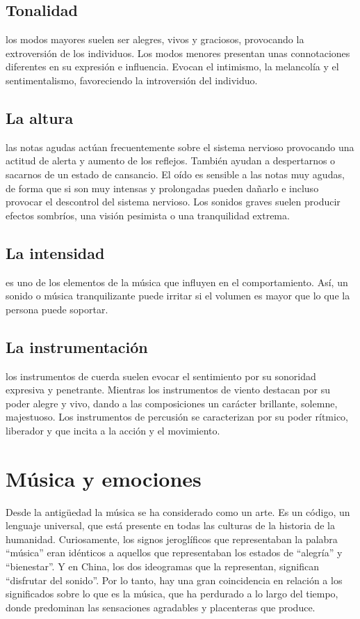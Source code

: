 \documentclass{bmcart}
\begin{document}
\subsection*{Tonalidad}
los modos mayores suelen ser alegres, vivos y graciosos, provocando la extroversión de los individuos. Los modos menores presentan unas connotaciones diferentes en su expresión e influencia. Evocan el intimismo, la melancolía y el sentimentalismo, favoreciendo la introversión del individuo.
\subsection*{La altura}
las notas agudas actúan frecuentemente sobre el sistema nervioso provocando una actitud de alerta y aumento de los reflejos. También ayudan a despertarnos o sacarnos de un estado de cansancio. El oído es sensible a las notas muy agudas, de forma que si son muy intensas y prolongadas pueden dañarlo e incluso provocar el descontrol del sistema nervioso. Los sonidos graves suelen producir efectos sombríos, una visión pesimista o una tranquilidad extrema.
\subsection*{La intensidad}
es uno de los elementos de la música que influyen en el comportamiento. Así, un sonido o música tranquilizante puede irritar si el volumen es mayor que lo que la persona puede soportar.
\subsection*{La instrumentación}
los instrumentos de cuerda suelen evocar el sentimiento por su sonoridad expresiva y penetrante. Mientras los instrumentos de viento destacan por su poder alegre y vivo, dando a las composiciones un carácter brillante, solemne, majestuoso. Los instrumentos de percusión se caracterizan por su poder rítmico, liberador y que incita a la acción y el movimiento.
\section*{Música y emociones}
Desde la antigüedad la música se ha considerado como un arte. Es un código, un lenguaje universal, que está presente en todas las culturas de la historia de la humanidad. Curiosamente, los signos jeroglíficos que representaban la palabra “música” eran idénticos a aquellos que representaban los estados de “alegría” y “bienestar”. Y en China, los dos ideogramas que la representan, significan “disfrutar del sonido”. Por lo tanto, hay una gran coincidencia en relación a los significados sobre lo que es la música, que ha perdurado a lo largo del tiempo, donde predominan las sensaciones agradables y placenteras que produce.
\end{document}
